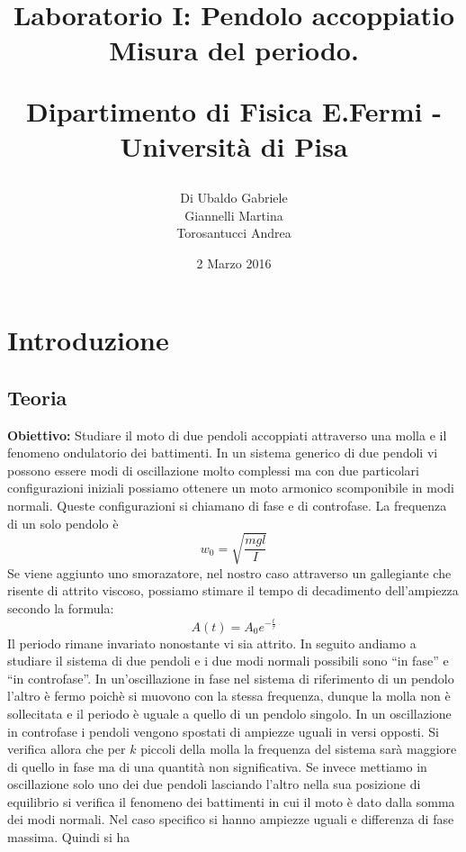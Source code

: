 \documentclass[a4paper,10pt]{article}
\title{Laboratorio I: Pendolo accoppiatio\\ Misura del periodo.\\
\begin{large}
Dipartimento di Fisica E.Fermi - Università di Pisa
\end{large}}
\author{Di Ubaldo Gabriele \\Giannelli Martina \\Torosantucci Andrea}
\date{2 Marzo 2016}
\begin{document}
\maketitle

\tableofcontents

\section{Introduzione}
\subsection{Teoria}
\textbf{Obiettivo:} Studiare il moto di due pendoli accoppiati attraverso una molla e il fenomeno ondulatorio dei battimenti.
In un sistema generico di due pendoli vi possono essere modi di oscillazione molto complessi ma con due particolari configurazioni iniziali possiamo ottenere un moto armonico scomponibile in 
modi normali. Queste configurazioni si chiamano di fase e di controfase. La frequenza di un solo pendolo è
\begin{equation}
 w_0=\sqrt{\frac{mgl}{I}}
\end{equation}
Se viene aggiunto uno smorazatore, nel nostro caso attraverso un gallegiante che risente di attrito viscoso, possiamo stimare il tempo di decadimento dell'ampiezza secondo la formula:
\begin{equation}
 A(t)=A_0 e^{-\frac{t}{\tau}}
\end{equation}
Il periodo rimane invariato nonostante vi sia attrito. 
In seguito andiamo a studiare il sistema di due pendoli e i due modi normali possibili sono ``in fase'' e ``in controfase''.
In un'oscillazione in fase nel sistema di riferimento di un pendolo l'altro è fermo poichè si muovono con la stessa frequenza, dunque la molla non è sollecitata e il periodo è uguale 
a quello di un pendolo singolo.
In un oscillazione in controfase i pendoli vengono spostati di ampiezze uguali in versi opposti. Si verifica allora che per $k$ piccoli della molla la frequenza del sistema sarà maggiore
di quello in fase ma di una quantità non significativa.
Se invece mettiamo in oscillazione solo uno dei due pendoli lasciando l'altro nella sua posizione di equilibrio si verifica il fenomeno dei battimenti in cui il moto è dato dalla somma 
dei modi normali. Nel caso specifico si hanno ampiezze uguali e differenza di fase massima. Quindi si ha
\end{document}
